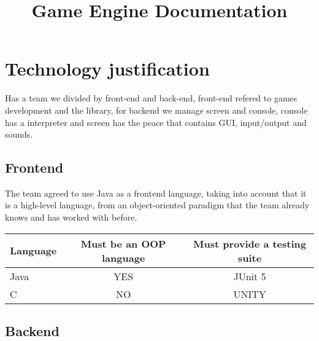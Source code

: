 \documentclass[a4paper,12pt]{article}
\title{Game Engine Documentation}
\author{}
\date{}
\begin{document}
\maketitle

\tableofcontents
\newpage

\section{Technology justification}
Has a team we divided by front-end and back-end, front-end refered to games development and the library, for backend we manage screen and console, console has a interpreter and screen has the peace that contains GUI, input/output and sounds.

\subsection{Frontend}

The team agreed to use Java as a frontend language, taking into account that it is a high-level language, from an object-oriented paradigm that the team already knows and has worked with before.

\begin{tabular}{|l|c|c|}
\hline
Language & Must be an OOP language & Must provide a testing suite \\
\hline
Java & YES & JUnit 5 \\
\hline
C & NO & UNITY \\
\hline
\end{tabular}

\subsection{Backend}
\end{document}
